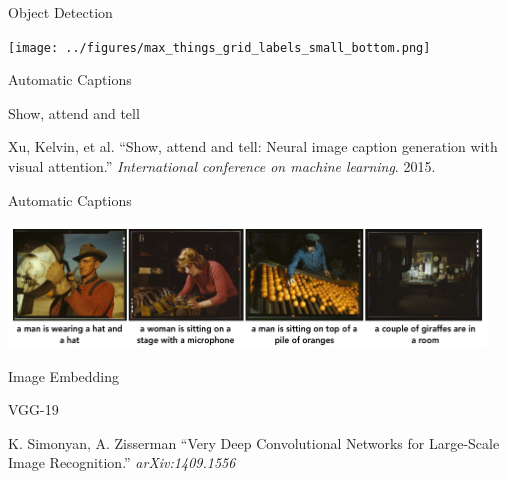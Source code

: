 \documentclass[12pt,ignorenonframetext,aspectratio=169]{beamer}
\makeatletter
\newcommand{\orange}[1]{\textcolor{solarized@orange}{#1}}
\makeatother
\begin{document}
\begin{frame}{Object Detection}

\begin{center}
\texttt{[image: ../figures/max\_things\_grid\_labels\_small\_bottom.png]}
\end{center}

\end{frame}

\begin{frame}{Automatic Captions}

\orange{Show, attend and tell}

Xu, Kelvin, et al. ``Show, attend and tell: Neural image caption generation with visual
attention.'' \textit{International conference on machine learning}. 2015.

\end{frame}

\begin{frame}{Automatic Captions}

\begin{center}
\includegraphics[width=0.95\textwidth]{../figures/captions.png}
\end{center}

\end{frame}

\begin{frame}{Image Embedding}

\orange{VGG-19}

K. Simonyan, A. Zisserman ``Very Deep Convolutional Networks for Large-Scale Image
Recognition.'' \textit{arXiv:1409.1556}

\end{frame}
\end{document}
